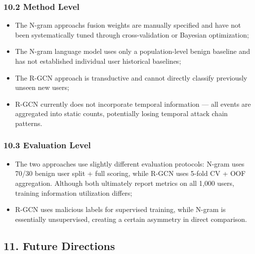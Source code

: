 \documentclass[
  a4paper,
  11pt]{article}
\providecommand{\tightlist}{%
  \setlength{\itemsep}{0pt}\setlength{\parskip}{0pt}}
\begin{document}
\subsubsection{10.2 Method Level}\label{102-method-level}

\begin{itemize}
\tightlist
\item
  The N-gram approach\textquotesingle s fusion weights are manually
  specified and have not been systematically tuned through
  cross-validation or Bayesian optimization;
\item
  The N-gram language model uses only a population-level benign baseline
  and has not established individual user historical baselines;
\item
  The R-GCN approach is transductive and cannot directly classify
  previously unseen new users;
\item
  R-GCN currently does not incorporate temporal information --- all
  events are aggregated into static counts, potentially losing temporal
  attack chain patterns.
\end{itemize}

\subsubsection{10.3 Evaluation Level}\label{103-evaluation-level}

\begin{itemize}
\tightlist
\item
  The two approaches use slightly different evaluation protocols: N-gram
  uses 70/30 benign user split + full scoring, while R-GCN uses 5-fold
  CV + OOF aggregation. Although both ultimately report metrics on all
  1,000 users, training information utilization differs;
\item
  R-GCN uses malicious labels for supervised training, while N-gram is
  essentially unsupervised, creating a certain asymmetry in direct
  comparison.
\end{itemize}

\subsection{11. Future Directions}\label{11-future-directions}
\end{document}

